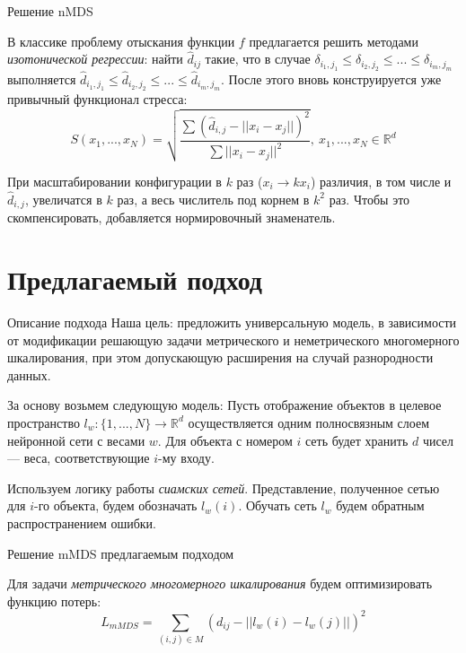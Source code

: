 \documentclass[9pt]{beamer}
\begin{document}
\begin{frame}{Решение nMDS}

В классике проблему отыскания функции $f$ предлагается решить методами \textit{изотонической регрессии}: найти $\hat{d}_{ij}$ такие, что в случае $\delta_{i_1, j_1} \leqslant \delta_{i_2, j_2} \leqslant ... \leqslant \delta_{i_m, j_m}$ выполняется $\hat{d}_{i_1, j_1} \leqslant \hat{d}_{i_2, j_2} \leqslant ... \leqslant \hat{d}_{i_m, j_m}$. После этого вновь конструируется уже привычный функционал стресса:
\begin{equation}
    \label{nmdsstress2}
        S(x_1, ..., x_N) = \sqrt{\dfrac{\sum(\hat{d}_{i, j} - ||x_i - x_j||)^2}{\sum ||x_i - x_j||^2}}, \: x_1, ..., x_N \in \mathbb{R}^d
\end{equation}

При масштабировании конфигурации в $k$ раз ($x_i \rightarrow k x_i$) различия, в том числе и $\hat{d}_{i, j}$, увеличатся в $k$ раз, а весь числитель под корнем в $k^2$ раз. Чтобы это скомпенсировать, добавляется нормировочный знаменатель.
    
\end{frame}

\section{Предлагаемый подход}
\begin{frame}{Описание подхода}
Наша цель: предложить универсальную модель, в зависимости от модификации решающую задачи метрического и неметрического многомерного шкалирования, при этом допускающую расширения на случай разнородности данных.
\vspace{\baselineskip} 

За основу возьмем следующую модель:
Пусть отображение объектов в целевое пространство $l_w: \{1, ..., N\} \to \mathbb{R}^d$ осуществляется одним полносвязным слоем нейронной сети с весами $w$. Для объекта с номером $i$ сеть будет хранить $d$ чисел --- веса, соответствующие $i$-му входу. 
\vspace{\baselineskip} 

Используем логику работы \textit{сиамских сетей}. 
Представление, полученное сетью для $i$-го объекта, будем обозначать $l_w
(i)$. Обучать сеть $l_w$ будем обратным распространением ошибки.
\end{frame}

\begin{frame}{Решение mMDS предлагаемым подходом}

Для задачи \textit{метрического многомерного шкалирования} будем оптимизировать функцию потерь:
\begin{equation}
    L_{mMDS} = \sum_{(i, j) \in M} (d_{ij} - || l_w(i) - l_w(j) ||)^2
\end{equation}
    
\end{frame}
\end{document}
